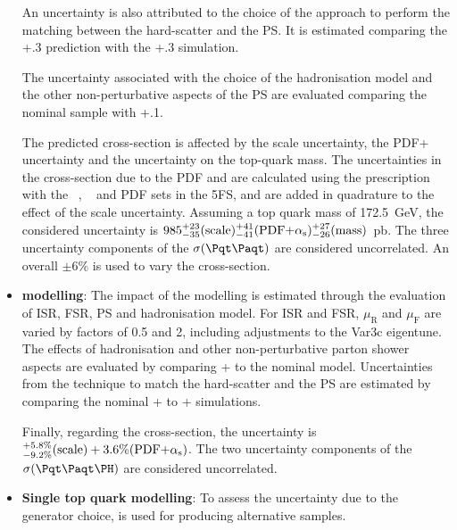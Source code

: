\begin{itemize}
		  An uncertainty is also attributed to the choice of the \POWHEG approach to perform 
		  the matching between the hard-scatter and the PS. It is estimated comparing 
		  the \POWHEG+.3 prediction with the \AMCatNLO+.3 simulation.
		
		The uncertainty associated with the choice of the hadronisation model and the other 
		non-perturbative aspects of the PS are evaluated comparing the nominal sample 
		with \POWHEG+.1.
		

		The predicted \ttbar cross-section is affected by the scale uncertainty, the PDF+\alphas 
		uncertainty and the uncertainty on the top-quark mass. 
	The uncertainties in the cross-section due to the PDF and \alphas are calculated using 
	the \PDFforLHC[15] prescription~\cite{Butterworth:2015oua}
	with the \MSTW[nnlo]~\cite{Martin:2009iq,Martin:2009bu}, 
	\CT[10nnlo]~\cite{Lai:2010vv,Gao:2013xoa}
	and \NNPDF[2.3lo] PDF sets in the 5FS, and are
	added in quadrature to the effect of the scale uncertainty.
		Assuming a top quark mass of
		172.5~GeV, the considered uncertainty is 
		$985^{+23}_{-35}(\text{scale})^{+41}_{-41}(\text{PDF+\ensuremath{\alpha_{\text{s}}}})^{+27}_{-26}(\text{mass})$~pb.
		The three uncertainty components of the $\sigma(\ttbar)$ are considered uncorrelated.
		An overall $\pm6\%$ is used to vary the \ttbar cross-section.
		 
	\item \textbf{\ttH modelling}: The impact of the \ttH modelling is estimated through the evaluation of 
		 ISR, FSR, PS and hadronisation model.
		 For ISR and FSR, $\mu_{\text{R}}$ and $\mu_{\text{F}}$ are varied by factors of 0.5 and 2, 
		 including adjustments to the Var3c eigentune. 
		 The effects of hadronisation and other non-perturbative parton shower aspects 
		 are evaluated by comparing \POWHEG+ to the nominal model. 
		 Uncertainties from the technique to match the hard-scatter and the PS are estimated
		 by comparing the nominal \POWHEG+ to \AMCatNLO+ simulations.
		 
		 Finally, regarding the cross-section, the uncertainty is $^{+5.8\%}_{-9.2\%}(\text{scale})+3.6\%(\text{PDF+\ensuremath{\alpha_{\text{s}}}})$. 
		 The two uncertainty components of the $\sigma(\ttH)$ are considered uncorrelated.
	
	\item \textbf{Single top quark modelling}: To assess the uncertainty due to the generator 
		choice, \MGNLO[2.6.2] is used for producing alternative samples.


\end{itemize}
